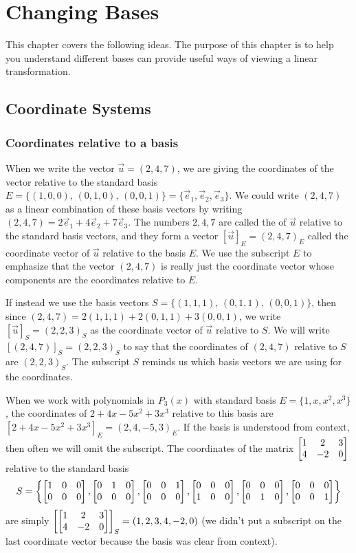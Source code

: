 

\chapter{Changing Bases}

This chapter covers the following ideas. The purpose of this chapter is to help you understand different bases can provide useful ways of viewing a linear transformation.






\section{Coordinate Systems}


\subsection{Coordinates relative to a basis}
When we write the vector $\vec u=(2,4,7)$, we are giving the coordinates of the vector relative to the standard basis $E=\{(1,0,0),\,(0,1,0),\,(0,0,1)\}=\{\vec e_1,\vec e_2,\vec e_3\}$. We could write $(2,4,7)$ as a linear combination of these basis vectors by writing $(2,4,7)=2\vec e_1+4\vec e_2+7\vec e_3$. The numbers $2,4,7$ are called the  of $\vec u$ relative to the standard basis vectors, and they form a vector $[\vec u]_E=(2,4,7)_E$ called the coordinate vector of $\vec u$ relative to the basis $E$.  We use the subscript $E$ to emphasize that the vector $(2,4,7)$ is really just the coordinate vector whose components are the coordinates relative to $E$.  

If instead we use the basis vectors $S=\{(1,1,1),\,(0,1,1),\,(0,0,1)\}$, then since $(2,4,7)=2(1,1,1)+2(0,1,1)+3(0,0,1)$, we write $[\vec u]_S=(2,2,3)_S$ as the coordinate vector of $\vec u$ relative to $S$. We will write $[(2,4,7)]_S = (2,2,3)_S$ to say that the coordinates of $(2,4,7)$ relative to $S$ are $(2,2,3)_S$. The subscript $S$ reminds us which basis vectors we are using for the coordinates.

When we work with polynomials in $P_3(x)$ with standard basis $E=\{1,x,x^2,x^3\}$, the coordinates of $2+4x-5x^2+3x^3$ relative to this basis are $[2+4x-5x^2+3x^3]_E = (2,4,-5,3)_E$. 
If the basis is understood from context, then often we will omit the subscript. The coordinates of the matrix $\begin{bmatrix} 1&2&3\\4&-2&0 \end{bmatrix}$ relative to the standard basis $$S = \left\{ \begin{bmatrix} 1&0&0\\0&0&0 \end{bmatrix} ,\begin{bmatrix} 0&1&0\\0&0&0 \end{bmatrix} ,\begin{bmatrix} 0&0&1\\0&0&0 \end{bmatrix} ,\begin{bmatrix} 0&0&0\\1&0&0 \end{bmatrix} ,\begin{bmatrix} 0&0&0\\0&1&0 \end{bmatrix} ,\begin{bmatrix} 0&0&0\\0&0&1 \end{bmatrix} \right\}$$ are simply $\left[\begin{bmatrix} 1&2&3\\4&-2&0 \end{bmatrix}\right]_S = (1,2,3,4,-2,0)$ (we didn't put a subscript on the last coordinate vector because the basis was clear from context).

